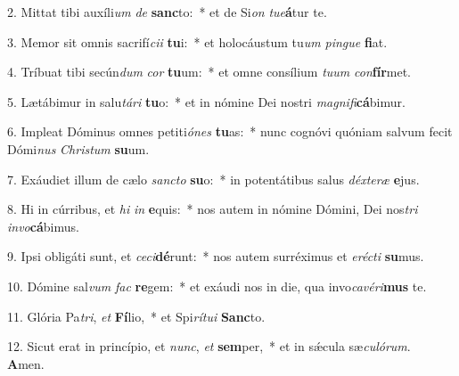 2. Mittat tibi auxíli\textit{um} \textit{de} \textbf{sanc}to:~*  et de Si\textit{on} \textit{tu}\textit{e}\textbf{á}tur te.\

3. Memor sit omnis sacrifí\textit{ci}\textit{i} \textbf{tu}i:~*  et holocáustum tu\textit{um} \textit{pin}\textit{gue} \textbf{fi}at.\

4. Tríbuat tibi secún\textit{dum} \textit{cor} \textbf{tu}um:~*  et omne consílium \textit{tu}\textit{um} \textit{con}\textbf{fír}met.\

5. Lætábimur in salu\textit{tá}\textit{ri} \textbf{tu}o:~*  et in nómine Dei nostri \textit{ma}\textit{gni}\textit{fi}\textbf{cá}bimur.\

6. Impleat Dóminus omnes petiti\textit{ó}\textit{nes} \textbf{tu}as:~*  nunc cognóvi quóniam salvum fecit Dómi\textit{nus} \textit{Chris}\textit{tum} \textbf{su}um.\

7. Exáudiet illum de cælo \textit{sanc}\textit{to} \textbf{su}o:~*  in potentátibus salus \textit{déx}\textit{te}\textit{ræ} \textbf{e}jus.\

8. Hi in cúrribus, et \textit{hi} \textit{in} \textbf{e}quis:~*  nos autem in nómine Dómini, Dei nos\textit{tri} \textit{in}\textit{vo}\textbf{cá}bimus.\

9. Ipsi obligáti sunt, et \textit{ce}\textit{ci}\textbf{dé}runt:~*  nos autem surréximus et \textit{e}\textit{réc}\textit{ti} \textbf{su}mus.\

10. Dómine sal\textit{vum} \textit{fac} \textbf{re}gem:~*  et exáudi nos in die, qua invo\textit{ca}\textit{vé}\textit{ri}\textbf{mus} te.\

11. Glória Pa\textit{tri}, \textit{et} \textbf{Fí}lio,~*  et Spi\textit{rí}\textit{tu}\textit{i} \textbf{Sanc}to.\

12. Sicut erat in princípio, et \textit{nunc}, \textit{et} \textbf{sem}per,~*  et in sǽcula sæ\textit{cu}\textit{ló}\textit{rum}. \textbf{A}men.\

